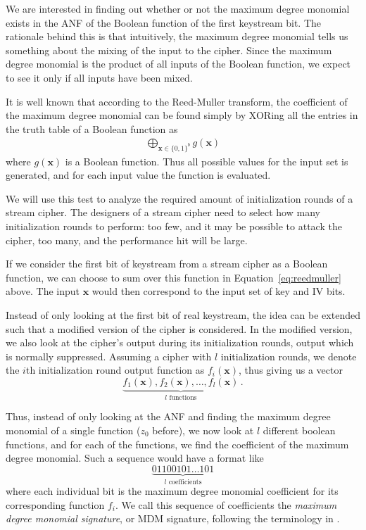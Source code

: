 {We are interested in finding out whether or not the maximum degree monomial exists in the ANF of the Boolean function of the first keystream bit. The rationale behind this is that intuitively, the maximum degree monomial tells us something about the mixing of the input to the cipher. Since the maximum degree monomial is the product of all inputs of the Boolean function, we expect to see it only if all inputs have been mixed.

It is well known that according to the Reed-Muller transform, the coefficient of the maximum degree monomial can be found simply by XORing all the entries in the truth table of a Boolean function as
\begin{align}
\bigoplus_{\bm{x} \in \{0,1\}^b}^{} g(\bm{x}) \label{eq:reedmuller}
\end{align}
where $g(\bm{x})$ is a Boolean function. Thus all possible values for the input set is generated, and for each input value the function is evaluated.

We will use this test to analyze the required amount of initialization rounds of a stream cipher. The designers of a stream cipher need to select how many initialization rounds to perform: too few, and it may be possible to attack the cipher, too many, and the performance hit will be large.

If we consider the first bit of keystream from a stream cipher as a Boolean function, we can choose to sum over this function in Equation~\ref{eq:reedmuller} above. The input $\bm{x}$ would then correspond to the input set of key and IV bits.

Instead of only looking at the first bit of real keystream, the idea can be extended such that a modified version of the cipher is considered. In the modified version, we also look at the cipher's output during its initialization rounds, output which is normally suppressed. Assuming a cipher with $l$ initialization rounds, we denote the $i$th initialization round output function as $f_i(\bm{x})$, thus giving us a vector
\[
\underbrace{f_1(\bm{x}), f_2(\bm{x}), \ldots, f_l(\bm{x})}_{l \text{ functions}} \,.
\]

Thus, instead of only looking at the ANF and finding the maximum degree monomial of a single function ($z_0$ before), we now look at $l$ different boolean functions, and for each of the functions, we find the coefficient of the maximum degree monomial. Such a sequence would have a format like
\[
\underbrace{01100101\ldots101}_{l\text{ coefficients}}
\]
where each individual bit is the maximum degree monomial coefficient for its corresponding function $f_i$.
We call this sequence of coefficients the \emph{maximum degree monomial signature}, or MDM signature, following the terminology in \cite{stankovski:2010}.

}
